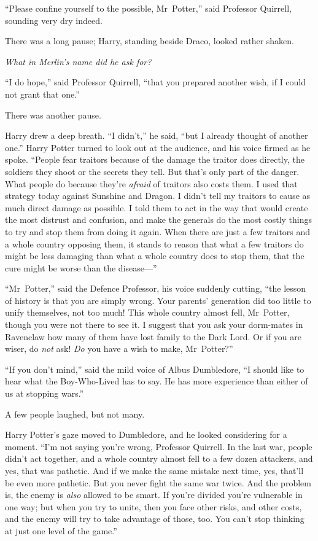 “Please confine yourself to the possible, Mr~Potter,” said Professor Quirrell, sounding very dry indeed.

There was a long pause; Harry, standing beside Draco, looked rather shaken.

\emph{What in Merlin’s name did he ask for?}

“I do hope,” said Professor Quirrell, “that you prepared another wish, if I could not grant that one.”

There was another pause.

Harry drew a deep breath. “I didn’t,” he said, “but I already thought of another one.” Harry Potter turned to look out at the audience, and his voice firmed as he spoke. “People fear traitors because of the damage the traitor does directly, the soldiers they shoot or the secrets they tell. But that’s only part of the danger. What people do because they’re \emph{afraid} of traitors also costs them. I used that strategy today against Sunshine and Dragon. I didn’t tell my traitors to cause as much direct damage as possible. I told them to act in the way that would create the most distrust and confusion, and make the generals do the most costly things to try and stop them from doing it again. When there are just a few traitors and a whole country opposing them, it stands to reason that what a few traitors do might be less damaging than what a whole country does to stop them, that the cure might be worse than the disease—”

“Mr~Potter,” said the Defence Professor, his voice suddenly cutting, “the lesson of history is that you are simply wrong. Your parents’ generation did too little to unify themselves, not too much! This whole country almost fell, Mr~Potter, though you were not there to see it. I suggest that you ask your dorm-mates in Ravenclaw how many of them have lost family to the Dark Lord. Or if you are wiser, do \emph{not} ask! \emph{Do} you have a wish to make, Mr~Potter?”

“If you don’t mind,” said the mild voice of Albus Dumbledore, “I should like to hear what the Boy-Who-Lived has to say. He has more experience than either of us at stopping wars.”

A few people laughed, but not many.

Harry Potter’s gaze moved to Dumbledore, and he looked considering for a moment. “I’m not saying you’re wrong, Professor Quirrell. In the last war, people didn’t act together, and a whole country almost fell to a few dozen attackers, and yes, that was pathetic. And if we make the same mistake next time, yes, that’ll be even more pathetic. But you never fight the same war twice. And the problem is, the enemy is \emph{also} allowed to be smart. If you’re divided you’re vulnerable in one way; but when you try to unite, then you face other risks, and other costs, and the enemy will try to take advantage of those, too. You can’t stop thinking at just one level of the game.”

